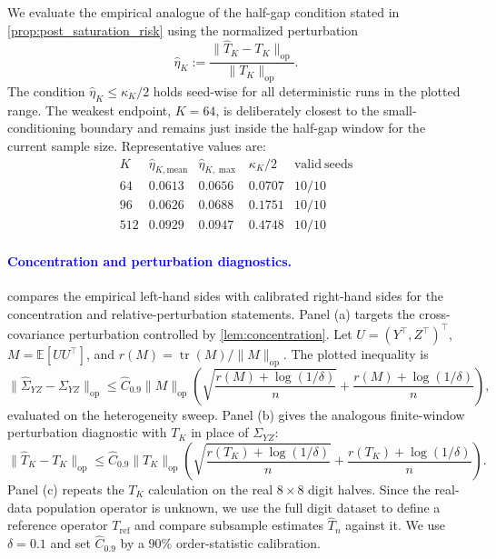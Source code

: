 We evaluate the empirical analogue of the half-gap condition stated in
\cref{prop:post_saturation_risk} using the normalized perturbation
\[
    \widehat{\eta}_K
    :=
    \frac{\|\widehat T_K-T_K\|_{\mathrm{op}}}
    {\|T_K\|_{\mathrm{op}}}.
\]
The condition $\widehat{\eta}_K\le \kappa_K/2$ holds seed-wise for all
deterministic runs in the plotted range. The weakest endpoint, $K=64$, is
deliberately closest to the small-conditioning boundary and remains just inside
the half-gap window for the current sample size.
Representative values are:
\[
\begin{array}{c|cccc}
K & \widehat{\eta}_{K,\mathrm{mean}} & \widehat{\eta}_{K,\max}
  & \kappa_K/2 & \mathrm{valid\ seeds} \\
\hline
64 & 0.0613 & 0.0656 & 0.0707 & 10/10 \\
96 & 0.0626 & 0.0688 & 0.1751 & 10/10 \\
512 & 0.0929 & 0.0947 & 0.4748 & 10/10
\end{array}
\]

\paragraph{\textcolor{blue}{Concentration and perturbation diagnostics.}}
{\color{blue} compares the empirical left-hand sides with
calibrated right-hand sides for the concentration and relative-perturbation
statements. Panel (a) targets the cross-covariance perturbation controlled by
\cref{lem:concentration}. Let $U=(Y^\top,Z^\top)^\top$, $M=\mathbb E[UU^\top]$, and
$r(M)=\operatorname{tr}(M)/\|M\|_{\mathrm{op}}$. The plotted inequality is}
{\color{blue}\[
    \|\widehat\Sigma_{YZ}-\Sigma_{YZ}\|_{\mathrm{op}}
    \le
    \widehat C_{0.9}\|M\|_{\mathrm{op}}
    \left(
    \sqrt{\frac{r(M)+\log(1/\delta)}{n}}
    +
    \frac{r(M)+\log(1/\delta)}{n}
    \right),
\]}
{\color{blue}evaluated on the heterogeneity sweep. Panel (b) gives the analogous
finite-window perturbation diagnostic with $T_K$ in place of $\Sigma_{YZ}$:}
{\color{blue}\[
    \|\widehat T_K-T_K\|_{\mathrm{op}}
    \le
    \widehat C_{0.9}\|T_K\|_{\mathrm{op}}
    \left(
    \sqrt{\frac{r(T_K)+\log(1/\delta)}{n}}
    +
    \frac{r(T_K)+\log(1/\delta)}{n}
    \right).
\]}
{\color{blue}Panel (c) repeats the $T_K$ calculation on the
real $8\times8$ digit halves. Since the real-data population operator is
unknown, we use the full digit dataset to define a reference operator
$T_{\mathrm{ref}}$ and compare subsample estimates $\widehat T_n$ against it.
We use $\delta=0.1$ and set
$\widehat C_{0.9}$ by a 90\% order-statistic calibration.}

